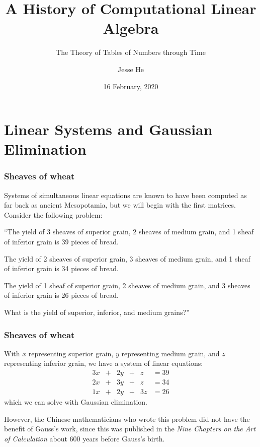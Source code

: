 \documentclass{beamer}
\title{A History of Computational Linear Algebra}
\subtitle{The Theory of Tables of Numbers through Time}
\author{Jesse He}
\institute{OSU Reading Classics}
\date{16 February, 2020}
\theoremstyle{definition}
\begin{document}
    
\frame{\titlepage}

\section{Linear Systems and Gaussian Elimination}
\begin{frame}
    \frametitle{Sheaves of wheat}

    Systems of simultaneous linear equations are known to have been computed as far back as ancient Mesopotamia, but we will begin with the first matrices.
    \pause
    Consider the following problem:

    \begin{problem}
        ``The yield of 3 sheaves of superior grain, 2 sheaves of medium grain, and 1 sheaf of inferior grain is 39 pieces of bread.

        The yield of 2 sheaves of superior grain, 3 sheaves of medium grain, and 1 sheaf of inferior grain is 34 pieces of bread.

        The yield of 1 sheaf of superior grain, 2 sheaves of medium grain, and 3 sheaves of inferior grain is 26 pieces of bread.

        What is the yield of superior, inferior, and medium grains?''
    \end{problem}
\end{frame}

\begin{frame}
    \frametitle{Sheaves of wheat}

    With $x$ representing superior grain, $y$ representing medium grain, and $z$ representing inferior grain, we have a system of linear equations:
    \begin{alignat*}
        3x & + & 2y & + & z & = 39 \\
        2x & + & 3y & + & z & = 34 \\
        1x & + & 2y & + & 3z & = 26
    \end{alignat*}
    which we can solve with Gaussian elimination.

    However, the Chinese mathematicians who wrote this problem did not have the benefit of Gauss's work, since this was published in the
    \textit{Nine Chapters on the Art of Calculation} about 600 years before Gauss's birth.\cite{vdw}
\end{frame}
\end{document}
